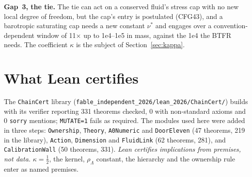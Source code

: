 \documentclass[10pt]{article}
\newcommand{\fpath}[1]{\nolinkurl{#1}}
\begin{document}
\textbf{Gap~3, the tie.} The tie can act on a conserved fluid's stress cap with no new local degree of freedom, but the cap's entry is postulated (CFG43), and a barotropic saturating cap needs a new constant $\nu^*$ and engages over a convention-dependent window of 11$\times$ up to 1e4--1e5 in mass, against the 1e4 the BTFR needs. The coefficient $\kappa$ is the subject of Section~\ref{sec:kappa}.

\section{What Lean certifies}\label{sec:lean}

The \fpath{ChainCert} library (\fpath{fable_independent_2026/lean_2026/ChainCert/}) builds with its verifier reporting 331 theorems checked, 0 with non-standard axioms and 0 \texttt{sorry} mentions; \texttt{MUTATE=1} fails as required. The modules used here were added in three steps: \texttt{Ownership}, \texttt{Theory}, \texttt{A0Numeric} and \texttt{DoorEleven} (47 theorems, 219 in the library), \texttt{Action}, \texttt{Dimension} and \texttt{FluidLink} (62 theorems, 281), and \texttt{CalibrationWall} (50 theorems, 331). \emph{Lean certifies implications from premises, not data.} $\kappa=\tfrac12$, the kernel, $\rho_\Lambda$ constant, the hierarchy and the ownership rule enter as named premises.
\end{document}

